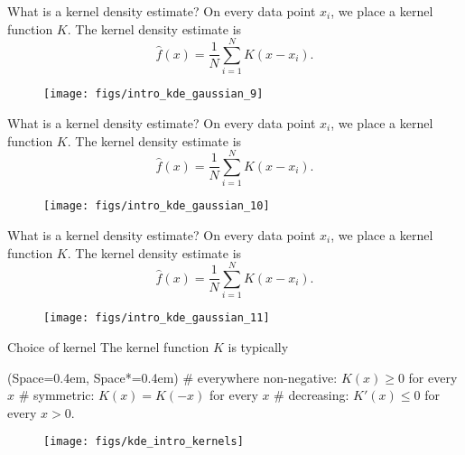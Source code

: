 \documentclass[11pt, aspectratio=149]{beamer}
\newcommand{\listSpace}{0.4em}
\theoremstyle{plain}
\begin{document}
\begin{frame}[fragile, t]{What is a kernel density estimate?}
	On every data point $x_i$, we place a kernel function $K$.
	The kernel density estimate is 
	\begin{equation*}
	\hat{f}(x) = \frac{1}{N} \sum_{i=1}^{N} K(x - x_i).
	\end{equation*}
	\vfill
	\begin{figure}
		\centering
		\texttt{[image: figs/intro\_kde\_gaussian\_9]}
	\end{figure}
\end{frame}


\begin{frame}[fragile, t]{What is a kernel density estimate?}
	On every data point $x_i$, we place a kernel function $K$.
	The kernel density estimate is 
	\begin{equation*}
	\hat{f}(x) = \frac{1}{N} \sum_{i=1}^{N} K(x - x_i).
	\end{equation*}
	\vfill
	\begin{figure}
		\centering
		\texttt{[image: figs/intro\_kde\_gaussian\_10]}
	\end{figure}
\end{frame}


\begin{frame}[fragile, t]{What is a kernel density estimate?}
	On every data point $x_i$, we place a kernel function $K$.
	The kernel density estimate is 
	\begin{equation*}
	\hat{f}(x) = \frac{1}{N} \sum_{i=1}^{N} K(x - x_i).
	\end{equation*}
	\vfill
	\begin{figure}
		\centering
		\texttt{[image: figs/intro\_kde\_gaussian\_11]}
	\end{figure}
\end{frame}


\begin{frame}[fragile, t]{Choice of kernel}
	The kernel function $K$ is typically
	\vspace{1em}
	\begin{easylist}[itemize]
		\ListProperties(Space=\listSpace, Space*=\listSpace)
		# everywhere non-negative: $K(x) \geq 0$ for every $x$
		# symmetric: $K(x) = K(-x)$  for every $x$
		# decreasing: $K'(x) \leq 0$  for every $x > 0$.
	\end{easylist}
	\vfill
	\begin{figure}
		\centering
		\texttt{[image: figs/kde\_intro\_kernels]}
	\end{figure}
\end{frame}
\end{document}
